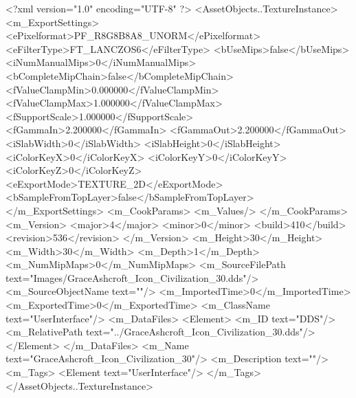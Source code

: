 <?xml version="1.0" encoding="UTF-8" ?>
<AssetObjects..TextureInstance>
	<m_ExportSettings>
		<ePixelformat>PF_R8G8B8A8_UNORM</ePixelformat>
		<eFilterType>FT_LANCZOS6</eFilterType>
		<bUseMips>false</bUseMips>
		<iNumManualMips>0</iNumManualMips>
		<bCompleteMipChain>false</bCompleteMipChain>
		<fValueClampMin>0.000000</fValueClampMin>
		<fValueClampMax>1.000000</fValueClampMax>
		<fSupportScale>1.000000</fSupportScale>
		<fGammaIn>2.200000</fGammaIn>
		<fGammaOut>2.200000</fGammaOut>
		<iSlabWidth>0</iSlabWidth>
		<iSlabHeight>0</iSlabHeight>
		<iColorKeyX>0</iColorKeyX>
		<iColorKeyY>0</iColorKeyY>
		<iColorKeyZ>0</iColorKeyZ>
		<eExportMode>TEXTURE_2D</eExportMode>
		<bSampleFromTopLayer>false</bSampleFromTopLayer>
	</m_ExportSettings>
	<m_CookParams>
		<m_Values/>
	</m_CookParams>
	<m_Version>
		<major>4</major>
		<minor>0</minor>
		<build>410</build>
		<revision>536</revision>
	</m_Version>
	<m_Height>30</m_Height>
	<m_Width>30</m_Width>
	<m_Depth>1</m_Depth>
	<m_NumMipMaps>0</m_NumMipMaps>
	<m_SourceFilePath text="Images/GraceAshcroft_Icon_Civilization_30.dds"/>
	<m_SourceObjectName text=""/>
	<m_ImportedTime>0</m_ImportedTime>
	<m_ExportedTime>0</m_ExportedTime>
	<m_ClassName text="UserInterface"/>
	<m_DataFiles>
		<Element>
			<m_ID text="DDS"/>
			<m_RelativePath text="../GraceAshcroft_Icon_Civilization_30.dds"/>
		</Element>
	</m_DataFiles>
	<m_Name text="GraceAshcroft_Icon_Civilization_30"/>
	<m_Description text=""/>
	<m_Tags>
		<Element text="UserInterface"/>
	</m_Tags>
</AssetObjects..TextureInstance>
